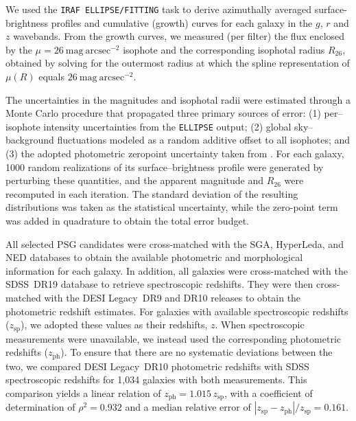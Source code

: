 \documentclass{aa}
\begin{document}
We used the \texttt{IRAF ELLIPSE/FITTING} task \citep{1987MNRAS.226..747J} to derive azimuthally averaged surface-brightness profiles and cumulative (growth) curves for each galaxy in the $g$, $r$ and $z$ wavebands. From the growth curves, we measured (per filter) the flux enclosed by the $\mu=26~\mathrm{mag~arcsec^{-2}}$ isophote and the corresponding isophotal radius $R_{26}$, obtained by solving for the outermost radius at which the spline representation of $\mu(R)$ equals $26~\mathrm{mag~arcsec^{-2}}$. 

The uncertainties in the magnitudes and isophotal radii were estimated through a Monte Carlo procedure that propagated three primary sources of error: (1) per–isophote intensity uncertainties from the \texttt{ELLIPSE} output; (2) global sky–background fluctuations modeled as a random additive offset to all isophotes; and (3) the adopted photometric zeropoint uncertainty taken from \citep{2023RNAAS...7..105Z}. For each galaxy, 1000 random realizations of its surface–brightness profile were generated by perturbing these quantities, and the apparent magnitude and $R_{26}$ were recomputed in each iteration. The standard deviation of the resulting distributions was taken as the statistical uncertainty, while the zero-point term was added in quadrature to obtain the total error budget.

All selected PSG candidates were cross-matched with the SGA, HyperLeda, and NED databases to obtain the available photometric and morphological information for each galaxy. In addition, all galaxies were cross-matched with the SDSS~DR19 database \citep[][submitted to AAS Journals]{2025arXiv250707093S} to retrieve spectroscopic redshifts. They were then cross-matched with the DESI Legacy~DR9 and DR10 releases to obtain the photometric redshift estimates. For galaxies with available spectroscopic redshifts ($z_\mathrm{sp}$), we adopted these values as their redshifts, $z$. When spectroscopic measurements were unavailable, we instead used the corresponding photometric redshifts ($z_\mathrm{ph}$). To ensure that there are no systematic deviations between the two, we compared DESI Legacy~DR10 photometric redshifts with SDSS spectroscopic redshifts for 1,034 galaxies with both measurements. This comparison yields a linear relation of $z_\mathrm{ph} = 1.015\,z_\mathrm{sp}$, with a coefficient of determination of $\rho^2 = 0.932$ and a median relative error of $|z_\mathrm{sp} - z_\mathrm{ph}| / z_\mathrm{sp} = 0.161$. 
\end{document}
